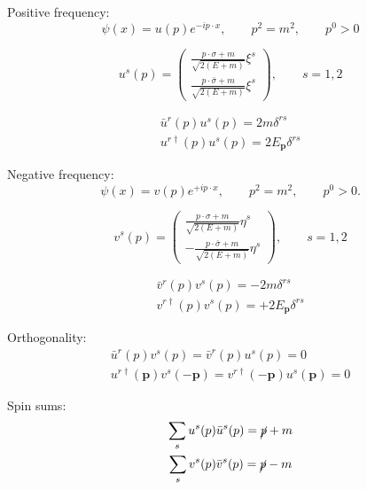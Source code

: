 \clearpage
{}\label{appendix:spinor_field}
Positive frequency:
\begin{equation*}
  \psi(x) = u(p)e^{-ip\cdot x},\qquad p^2 = m^2,\qquad p^0 > 0
\end{equation*}

\begin{equation*}
  u^s(p)=\begin{pmatrix}
    \frac{p\cdot \sigma + m}{\sqrt{2(E+m)}}\xi^s \\
    \frac{p\cdot \bar{\sigma} + m}{\sqrt{2(E+m)}}\xi^s
  \end{pmatrix},\qquad s = 1,2
\end{equation*}

\begin{gather*}
  \bar{u}^r(p)u^s(p) = 2m\delta^{rs}\\
  u^{r\dagger}(p)u^s(p) = 2E_{\mathbf{p}}\delta^{rs}
\end{gather*}

Negative frequency:
\begin{equation*}
  \psi(x) = v(p)e^{+ip\cdot x},\qquad p^2 = m^2,\qquad p^0 > 0.
\end{equation*}

\begin{equation*}
  v^s(p)=\begin{pmatrix}
    \frac{p\cdot \sigma + m}{\sqrt{2(E+m)}}\eta^s \\
    -\frac{p\cdot \bar{\sigma} + m}{\sqrt{2(E+m)}}\eta^s
  \end{pmatrix},\qquad s = 1,2
\end{equation*}

\begin{gather*}
  \bar{v}^r(p)v^s(p) = -2m\delta^{rs}\\
  v^{r\dagger}(p)v^s(p) = +2E_{\mathbf{p}}\delta^{rs}
\end{gather*}

Orthogonality:
\begin{gather*}
  \bar{u}^r(p)v^s(p) = \bar{v}^r(p)u^s(p) = 0\\
  u^{r\dagger}(\mathbf{p})v^s(-\mathbf{p}) = v^{r\dagger}(-\mathbf{p})u^s(\mathbf{p}) = 0
\end{gather*}

Spin sums:
\begin{gather*}
  \sum_s u^s(p)\bar{u}^s(p) = \cancel{p} + m\\
  \sum_s v^s(p)\bar{v}^s(p) = \cancel{p} - m
\end{gather*}
\clearpage




